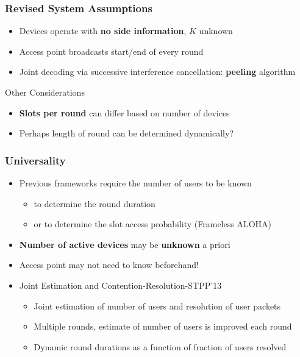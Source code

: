 \documentclass[10pt]{beamer}
\begin{document}
\begin{frame}
\frametitle{Revised System Assumptions}
\begin{itemize}
\item Devices operate with \textbf{no side information}, $K$ unknown
\item Access point broadcasts start/end of every round
\item Joint decoding via successive interference cancellation: \textbf{peeling} algorithm
\end{itemize}
\begin{block}{Other Considerations}
\begin{itemize}
\item \textbf{Slots per round} can differ based on number of devices
\item Perhaps length of round  can be determined dynamically?
\end{itemize}
\begin{center}

\end{center}
\end{block}
\end{frame}


\begin{frame}
\frametitle{Universality}
\begin{itemize}
	\item Previous frameworks require the number of users to be known
		\begin{itemize}
			\item to determine the round duration
			\item or to determine the slot access probability (Frameless ALOHA)
		\end{itemize}
\vspace{3mm}

	\item<2-> \textbf{Number of active devices} may be \textbf{unknown} a priori
	\item<2-> Access point may not need to know beforehand!

\vspace{3mm}
	\item<3-> Joint Estimation and Contention-Resolution-STPP'13\footnotemark
		\begin{itemize}
			\item<3-> Joint estimation of number of users and resolution of user packets
			\item<3-> Multiple rounds, estimate of number of users is improved each round
			\item<3-> Dynamic round durations as a function of fraction of users resolved
		\end{itemize}
\end{itemize}

\vspace{3mm}

\end{frame}
\end{document}
